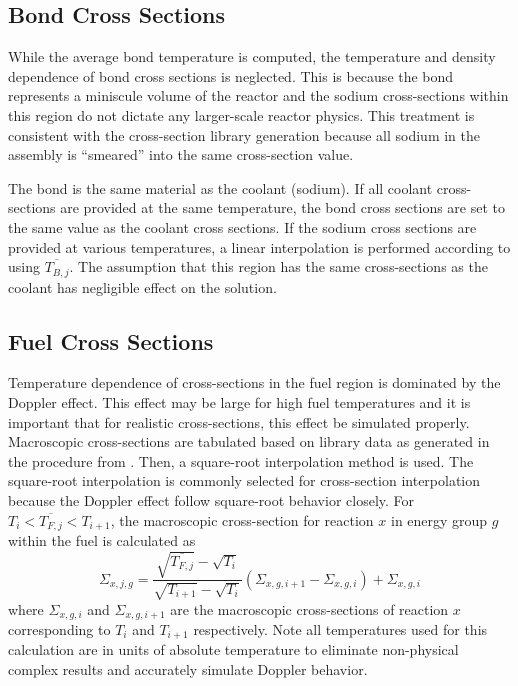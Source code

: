   \subsection{Bond Cross Sections}
    While the average bond temperature is computed, the temperature and density
    dependence of bond cross sections is neglected. This is because the bond 
    represents a miniscule volume of the reactor and the sodium cross-sections 
    within this region do not dictate any larger-scale reactor physics. This
    treatment is consistent with the cross-section library generation because
    all sodium in the assembly is ``smeared'' into the same cross-section value.

    The bond is the same material as the coolant (sodium). If all coolant 
    cross-sections are provided at the same temperature, the bond cross sections
    are set to the same value as the coolant cross sections. If the sodium cross
    sections are provided at various temperatures, a linear interpolation is 
    performed according to  using
    $\overline{T_{B,j}}$. The assumption that this region has the
    same cross-sections as the coolant has negligible effect on the solution.

  \subsection{Fuel Cross Sections}
    Temperature dependence of cross-sections in the fuel region is dominated
    by the Doppler effect. This effect may be large for high fuel temperatures
    and it is important that for realistic cross-sections, this effect be
    simulated properly. Macroscopic cross-sections are tabulated based on
    library data as generated in the procedure from
    . Then, a square-root interpolation method
    is used. The square-root interpolation is commonly selected for 
    cross-section interpolation because the Doppler effect follow square-root 
    behavior closely. For ${T_i < \overline{T_{F,j}} < T_{i+1}}$, the 
    macroscopic cross-section for reaction $x$ in energy group $g$ within the 
    fuel is calculated as
    \begin{equation}
      \Sigma_{x,j,g} = 
        \frac{\sqrt{\overline{T_{F,j}}} - \sqrt{T_{i}}}
        {\sqrt{T_{i+1}}-\sqrt{T_{i}}}
        (\Sigma_{x,g,i+1} - \Sigma_{x,g,i})  + \Sigma_{x,g,i}
    \end{equation}
    where $\Sigma_{x,g,i}$ and $\Sigma_{x,g,i+1}$ are the macroscopic
    cross-sections of reaction $x$ corresponding to $T_i$ and $T_{i+1}$
    respectively. Note all temperatures used for this calculation are in units
    of absolute temperature to eliminate non-physical complex results and
    accurately simulate Doppler behavior.
      
